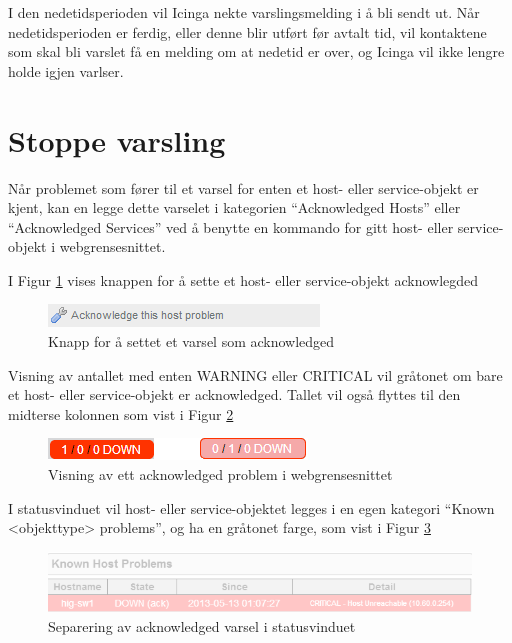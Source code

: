 I den nedetidsperioden vil Icinga nekte varslingsmelding i å bli sendt ut. Når nedetidsperioden er ferdig, eller denne blir utført før avtalt tid, vil kontaktene som skal bli varslet få en melding om at nedetid er over, og Icinga vil ikke lengre holde igjen varlser.

\section{Stoppe varsling}
Når problemet som fører til et varsel for enten et host- eller service-objekt er kjent, kan en legge dette varselet i kategorien ``Acknowledged Hosts'' eller
``Acknowledged Services'' ved å benytte en kommando for gitt host- eller service-objekt i webgrensesnittet.

I Figur \ref{ackbutton} vises knappen for å sette et host- eller service-objekt acknowlegded

\begin{figure}[H]
    \centering
    \includegraphics{img/ack_button}
    \caption{Knapp for å settet et varsel som acknowledged}
    \label{ackbutton}
\end{figure}

Visning av antallet med enten WARNING eller CRITICAL vil gråtonet om bare et host- eller service-objekt er acknowledged. Tallet vil også flyttes til den midterse kolonnen som vist i Figur \ref{ackcombined} 

\begin{figure}[H]
    \centering
    \includegraphics{img/ack_combined}
    \caption{Visning av ett acknowledged problem i webgrensesnittet}
    \label{ackcombined}
\end{figure}

I statusvinduet vil host- eller service-objektet legges i en egen kategori ``Known <objekttype> problems'', og ha en gråtonet farge, som vist i Figur \ref{ackstatusvindu}

\begin{figure}[H]
    \centering
    \includegraphics{img/ack_statusvindu}
    \caption{Separering av acknowledged varsel i statusvinduet}
    \label{ackstatusvindu}
\end{figure}


